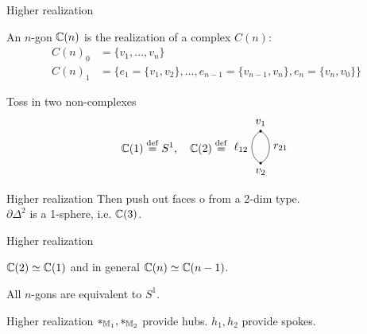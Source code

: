 \documentclass[14pt,aspectratio=169]{beamer}
\renewcommand{\defemph}[1]{\alert{#1}}
\begin{document}
\begin{frame}{Higher realization}
\vspace{5pt}\begin{definition}
An \defemph{\( n \)-gon} \( \mathbb{C}(n) \) is the realization of a complex \( C(n) \):
\begin{align*}
C(n)_0 &= \{v_1,\ldots,v_n\} \\
C(n)_1 &= \{e_1=\{v_1,v_2\}, \ldots, e_{n-1}=\{v_{n-1}, v_n\}, e_n=\{v_n, v_0\}\}
\end{align*}
\end{definition}
\vspace{-15pt}Toss in two non-complexes \vspace{-20pt}
\[ \ccc(1)\defeq S^1,\quad \ccc(2)\defeq \begin{tikzpicture}[scale=0.5, baseline=3.5mm]
\tikzset{arrow/.style={-{Stealth[scale=1.1]}}}
\tikzset{oo/.style={circle, scale=0.25, fill=black}}
\tikzset{ooo/.style={circle, scale=0.25, fill=none}}
\node[oo, label=above:\( v_1 \)] (V1) at (0, 2) {};
\node[oo, label=below:\( v_2 \)] (V2) at (0, 0) {};
\node[ooo] (V21) at (0.3, 1.75) {};
\node[ooo] (V22) at (0.3, 0.25) {};
\draw (V1) edge[bend right=60, swap, "\( \ell_{12} \)"] (V2);
\draw (V1) edge[bend left=60, "\( r_{21} \)"] (V2);
\end{tikzpicture}\]
\end{frame}

\begin{frame}{Higher realization}
Then push out faces o from a 2-dim type.
\[\]
\( \partial\Delta^2 \) is a 1-sphere, i.e. \( \mathbb{C}(3) \).
\end{frame}

\begin{frame}{Higher realization}
\begin{lemma}
\( \mathbb{C}(2)\simeq \mathbb{C}(1) \) and in general \( \mathbb{C}(n)\simeq\mathbb{C}(n-1) \).
\end{lemma}
\begin{corollary}
All \( n \)-gons are equivalent to \( S^1 \).
\end{corollary}
\end{frame}

\begin{frame}{Higher realization}
\( *_{\mathbb{M}_1}, *_{\mathbb{M}_2} \) provide \alert{hubs}. \( h_1, h_2 \) provide \alert{spokes}.
\[\]
\end{frame}
\end{document}
